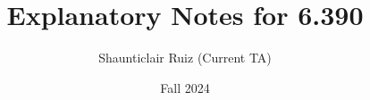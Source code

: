 \documentclass[10pt,oneside]{book}
\title{Explanatory Notes for 6.390}
\author{Shaunticlair Ruiz (Current TA)}
\date{Fall 2024}
\begin{document}
\maketitle

\setcounter{tocdepth}{2} %
\tableofcontents

\iffalse
 
 
\fi
 \iffalse
 



 
 
\fi
\iffalse
 






 
 

 
 

 







 
 
 


 

\fi
 
\iffalse

 




 \begin{appendices}
    \renewcommand{\thechapter}{A}
    

    \renewcommand{\thechapter}{B}
    
    
    \renewcommand{\thechapter}{C}
    

    \renewcommand{\thechapter}{D}
    

 \end{appendices}

\fi











% 
% 
%
\end{document}
